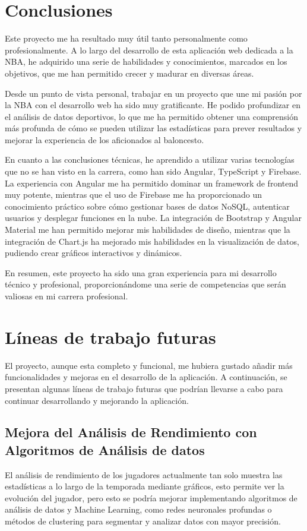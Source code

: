 
\section{Conclusiones}

Este proyecto me ha resultado muy útil tanto personalmente como profesionalmente. A lo largo del desarrollo de esta aplicación web dedicada a la NBA, he adquirido una serie de habilidades y conocimientos, marcados en los objetivos, que me han permitido crecer y madurar en diversas áreas.

Desde un punto de vista personal, trabajar en un proyecto que une mi pasión por la NBA con el desarrollo web ha sido muy gratificante. He podido profundizar en el análisis de datos deportivos, lo que me ha permitido obtener una comprensión más profunda de cómo se pueden utilizar las estadísticas para prever resultados y mejorar la experiencia de los aficionados al baloncesto.

En cuanto a las conclusiones técnicas, he aprendido a utilizar varias tecnologías que no se han visto en la carrera, como han sido Angular, TypeScript y Firebase. La experiencia con Angular me ha permitido dominar un framework de frontend muy potente, mientras que el uso de Firebase me ha proporcionado un conocimiento práctico sobre cómo gestionar bases de datos NoSQL, autenticar usuarios y desplegar funciones en la nube. La integración de Bootstrap y Angular Material me han permitido mejorar mis habilidades de diseño, mientras que la integración de Chart.js ha mejorado mis habilidades en la visualización de datos, pudiendo crear gráficos interactivos y dinámicos.

En resumen, este proyecto ha sido una gran experiencia para mi desarrollo técnico y profesional, proporcionándome una serie de competencias que serán valiosas en mi carrera profesional.

\section{Líneas de trabajo futuras}

El proyecto, aunque esta completo y funcional, me hubiera gustado añadir más funcionalidades y mejoras en el desarrollo de la aplicación. A continuación, se presentan algunas líneas de trabajo futuras que podrían llevarse a cabo para continuar desarrollando y mejorando la aplicación.

\subsection{Mejora del Análisis de Rendimiento con Algoritmos de Análisis de datos}
El análisis de rendimiento de los jugadores actualmente tan solo muestra las estadísticas a lo largo de la temporada mediante gráficos, esto permite ver la evolución del jugador, pero esto se podría mejorar implementando algoritmos de análisis de datos y Machine Learning, como redes neuronales profundas o métodos de clustering para segmentar y analizar datos con mayor precisión.

